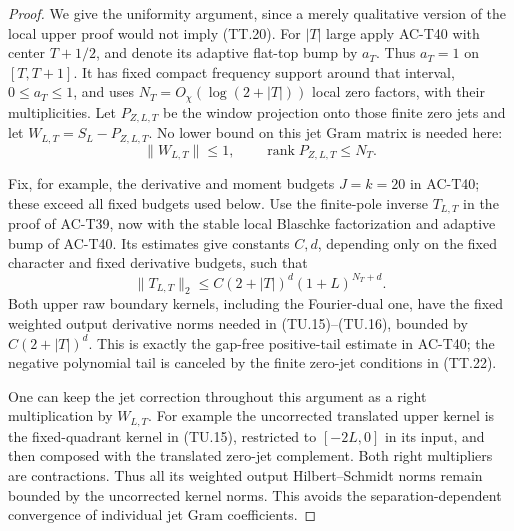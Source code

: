 \begin{proof}
We give the uniformity argument, since a merely qualitative
version of the local upper proof would not imply (TT.20).
For \(|T|\) large apply AC-T40 with center \(T+1/2\),
and denote its adaptive flat-top bump by \(a_T\).
Thus \(a_T=1\) on \([T,T+1]\).
It has fixed compact frequency support around that interval,
\(0\leq a_T\leq1\), and uses \(N_T=O_\chi(\log(2+|T|))\)
local zero factors, with their multiplicities.
Let \(P_{Z,L,T}\) be the window projection onto those
finite zero jets and let \(W_{L,T}=S_L-P_{Z,L,T}\).
No lower bound on this jet Gram matrix is needed here:
\[
        \|W_{L,T}\|\leq1,\qquad
                    \operatorname{rank}P_{Z,L,T}\leq N_T.
 \tag{TT.22}
\]

Fix, for example, the derivative and moment budgets
\(J=k=20\) in AC-T40; these exceed all fixed budgets
used below.
Use the finite-pole inverse \(T_{L,T}\) in the proof of
AC-T39, now with the stable local Blaschke factorization
and adaptive bump of AC-T40.
Its estimates give constants \(C,d\), depending only on
the fixed character and fixed derivative budgets, such that
\[
 \|T_{L,T}\|_2
       \leq C(2+|T|)^d(1+L)^{N_T+d}.
 \tag{TT.23}
\]
Both upper raw boundary kernels, including the Fourier-dual
one, have the fixed weighted output derivative norms needed
in (TU.15)--(TU.16), bounded by \(C(2+|T|)^d\).
This is exactly the gap-free positive-tail estimate in
AC-T40; the negative polynomial tail is canceled by
the finite zero-jet conditions in (TT.22).

One can keep the jet correction throughout this argument
as a right multiplication by \(W_{L,T}\).
For example the uncorrected translated upper kernel is
the fixed-quadrant kernel in (TU.15), restricted to
\([-2L,0]\) in its input, and then composed with the
translated zero-jet complement.
Both right multipliers are contractions.
Thus all its weighted output Hilbert--Schmidt norms
remain bounded by the uncorrected kernel norms.
This avoids the separation-dependent convergence of
individual jet Gram coefficients.


\end{proof}

